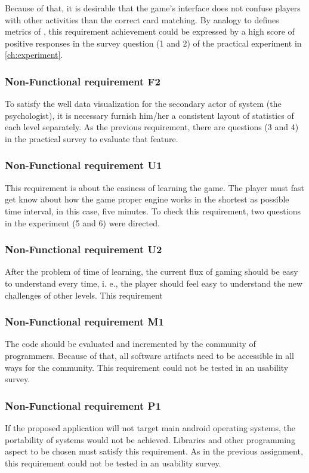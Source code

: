 \begin{table}[h!]
Because of that, it is desirable that the game's interface does not confuse players with other activities than the correct card matching. By analogy to defines metrics of \cite{ISO9126a}, this requirement achievement could be expressed by a high score of positive responses in the survey question (1 and 2) of the practical experiment in \ref{ch:experiment}. 

\subsubsection{Non-Functional requirement F2}

To satisfy the well data visualization for the secondary actor of system (the psychologist), it is necessary furnish him/her a consistent layout of statistics of each level separately. As the previous requirement, there are questions (3 and 4) in the practical survey to evaluate that feature.

\subsubsection{Non-Functional requirement U1}

This requirement is about the easiness of learning the game. The player must fast get know about how the game proper engine works in the shortest as possible time interval, in this case, five minutes. To check this requirement,  two questions in the experiment (5 and 6) were directed.

\subsubsection{Non-Functional requirement U2}

After the problem of time of learning, the current flux of gaming should be easy to understand every time, i. e., the player should feel easy to understand the new challenges of other levels. This requirement

\subsubsection{Non-Functional requirement M1}

The code should be evaluated and incremented by the community of programmers. Because of that, all software artifacts need to be accessible in all ways for  the community. This requirement could not be tested in an usability survey.

\subsubsection{Non-Functional requirement P1}

If the proposed application will not target main android operating systems, the portability of systems would not be achieved. Libraries and other programming aspect to be chosen must satisfy this requirement. As in the previous assignment, this requirement could not be tested in an usability survey.

\end{table}


